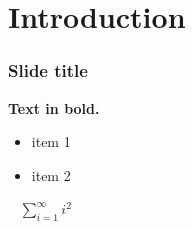 \section{Introduction}

\begin{frame}
\frametitle{Slide title}
\textbf{Text in bold.} \\
\begin{itemize}
\item item 1
\item item 2
\end{itemize}
\pause
\ \newline
$\sum_{i=1}^\infty i^2$
\end{frame}

